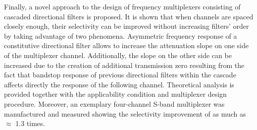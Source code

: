 \indent Finally, a novel approach to the design of frequency multiplexers consisting of cascaded directional filters is proposed. It is shown that when channels are spaced closely enough, their selectivity can be improved without increasing filters' order by taking advantage of two phenomena. Asymmetric frequency response of a constitutive directional filter allows to increase the attenuation slope on one side of the multiplexer channel. Additionally, the slope on the other side can be increased due to the creation of additional transmission zero resulting from the fact that bandstop response of previous directional filters within the cascade affects directly the response of the following channel. Theoretical analysis is provided together with the applicability condition and multiplexer design procedure. Moreover, an exemplary four-channel S-band multiplexer was manufactured and measured showing the selectivity improvement of as much as $\approx$ 1.3 times.

\cleardoublepage



\cleardoublepage



\cleardoublepage




\cleardoublepage